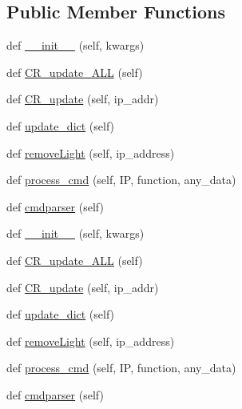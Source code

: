 \subsection*{Public Member Functions}
\begin{DoxyCompactItemize}
\item 
def \hyperlink{classTestingGUI_1_1Methods_a6b7453ea737e1e8b53e33f999d0c9f2a}{\+\_\+\+\_\+init\+\_\+\+\_\+} (self, kwargs)
\item 
def \hyperlink{classTestingGUI_1_1Methods_a7caae1065692f63bf28b64e8f7c0709b}{C\+R\+\_\+update\+\_\+\+A\+LL} (self)
\item 
def \hyperlink{classTestingGUI_1_1Methods_a9c1aa20eca768d36ff23c118e35052eb}{C\+R\+\_\+update} (self, ip\+\_\+addr)
\item 
def \hyperlink{classTestingGUI_1_1Methods_a0709231f5f6f33c59ce325c7e3ebf156}{update\+\_\+dict} (self)
\item 
def \hyperlink{classTestingGUI_1_1Methods_adcf75d9e2ac64426a6f46e7797d221c0}{remove\+Light} (self, ip\+\_\+address)
\item 
def \hyperlink{classTestingGUI_1_1Methods_a5313fe533c054cf6077aeb101de8e73b}{process\+\_\+cmd} (self, IP, function, any\+\_\+data)
\item 
def \hyperlink{classTestingGUI_1_1Methods_aefc0f91f471aeef7ee76a5ad85ad8afc}{cmdparser} (self)
\item 
def \hyperlink{classTestingGUI_1_1Methods_a6b7453ea737e1e8b53e33f999d0c9f2a}{\+\_\+\+\_\+init\+\_\+\+\_\+} (self, kwargs)
\item 
def \hyperlink{classTestingGUI_1_1Methods_a7caae1065692f63bf28b64e8f7c0709b}{C\+R\+\_\+update\+\_\+\+A\+LL} (self)
\item 
def \hyperlink{classTestingGUI_1_1Methods_a9c1aa20eca768d36ff23c118e35052eb}{C\+R\+\_\+update} (self, ip\+\_\+addr)
\item 
def \hyperlink{classTestingGUI_1_1Methods_a0709231f5f6f33c59ce325c7e3ebf156}{update\+\_\+dict} (self)
\item 
def \hyperlink{classTestingGUI_1_1Methods_adcf75d9e2ac64426a6f46e7797d221c0}{remove\+Light} (self, ip\+\_\+address)
\item 
def \hyperlink{classTestingGUI_1_1Methods_a5313fe533c054cf6077aeb101de8e73b}{process\+\_\+cmd} (self, IP, function, any\+\_\+data)
\item 
def \hyperlink{classTestingGUI_1_1Methods_aefc0f91f471aeef7ee76a5ad85ad8afc}{cmdparser} (self)
\end{DoxyCompactItemize}


